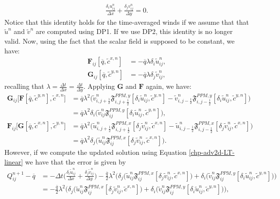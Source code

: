 \begin{align}
\label{discrete-divfree}
  \frac{\delta_i u_{ij}^n}{\Delta x} + \frac{\delta_j v_{ij}^n}{\Delta y} = 0.
\end{align}
Notice that this identity holds for the time-averaged winds if we assume that
that $\tilde{u}^n$ and  $\tilde{v}^n$ are computed using DP1.
If we use DP2, this identity is no longer valid.
Now, using the fact that the scalar field is supposed to be constant, we have:
\begin{align*}
\mathbf{F}_{ij}[\overline{q},\tilde{c}^{x,n}] &= -\overline{q} \lambda \delta_i \tilde{u}_{ij}^n,\\
\mathbf{G}_{ij}[\overline{q},\tilde{c}^{y,n}] &= -\overline{q} \lambda \delta_j \tilde{v}_{ij}^n,
\end{align*}
recalling that $\lambda = \frac{\Delta t}{\Delta x} = \frac{\Delta t}{\Delta y}$.
Applying $\mathbf{G}$ and $\mathbf{F}$ again, we have:
\begin{align*}
\mathbf{G}_{ij}\big[\mathbf{F}[{\overline{q},\tilde{c}^{y,n}}],\tilde{c}^{x,n}\big] &= 
   \overline{q}\lambda^2 \bigg(
   \tilde{v}_{i,j+\frac{1}{2}}^n\mathfrak{F}_{i,j+\frac{1}{2}}^{PPM,y}[ {\delta_i} \tilde{u}_{ij}^n,\tilde{c}^{y,n}] 
-  \tilde{v}_{i,j-\frac{1}{2}}^n\mathfrak{F}_{i,j-\frac{1}{2}}^{PPM,y}[ {\delta_i} \tilde{u}_{ij}^n,\tilde{c}^{y,n}]\bigg)\\
&=  \overline{q}\lambda^2\delta_i \big( \tilde{v}_{ij}^n\mathfrak{F}_{ij}^{PPM,y}[ {\delta_i} \tilde{u}_{ij}^n,\tilde{c}^{y,n}] \big),
\end{align*}
\begin{align*}
\mathbf{F}_{ij}\big[\mathbf{G}[{\overline{q},\tilde{c}^{x,n}}],\tilde{c}^{y,n}\big] &= 
   \overline{q}\lambda^2 \bigg(
   \tilde{u}_{i,j+\frac{1}{2}}^n\mathfrak{F}_{i,j+\frac{1}{2}}^{PPM,x}[ {\delta_j} \tilde{v}_{ij}^n,\tilde{c}^{x,n}] 
-  \tilde{u}_{i,j-\frac{1}{2}}^n\mathfrak{F}_{i,j-\frac{1}{2}}^{PPM,x}[ {\delta_j} \tilde{v}_{ij}^n,\tilde{c}^{x,n}] \bigg)\\
&=  \overline{q}\lambda^2\delta_j \big( \tilde{u}_{ij}^n\mathfrak{F}_{ij}^{PPM,x}[ {\delta_j} \tilde{v}_{ij}^n,\tilde{c}^{x,n}] \big).
\end{align*}
However, if we compute the updated solution using Equation \eqref{chp-adv2d-LT-linear} we have that the error is given by
\begin{align}
	\label{chp-adv2d-LT-error}
	Q^{n+1}_{ij} - \overline{q} &= 
	-\Delta t \bigg(\frac{\delta_i \tilde{u}_{ij}^n}{\Delta x} + \frac{\delta_j \tilde{v}_{ij}^n}{\Delta y} \bigg)
	-\frac{\overline{q}}{2}\lambda^2
	\bigg(
	\delta_j \big( \tilde{u}_{ij}^n\mathfrak{F}_{ij}^{PPM,x}[ {\delta_j} \tilde{v}_{ij}^n,\tilde{c}^{x,n}] \big)+
        \delta_i \big( \tilde{v}_{ij}^n\mathfrak{F}_{ij}^{PPM,y}[ {\delta_i} \tilde{u}_{ij}^n,\tilde{c}^{y,n}] \big)\bigg) \nonumber\\
	&=
	-\frac{\overline{q}}{2}\lambda^2
	\bigg(
	\delta_j \big( \tilde{u}_{ij}^n\mathfrak{F}_{ij}^{PPM,x}[ {\delta_j} \tilde{v}_{ij}^n,\tilde{c}^{x,n}] \big)+
        \delta_i \big( \tilde{v}_{ij}^n\mathfrak{F}_{ij}^{PPM,y}[ {\delta_i} \tilde{u}_{ij}^n,\tilde{c}^{y,n}] \big)\bigg),
\end{align}

